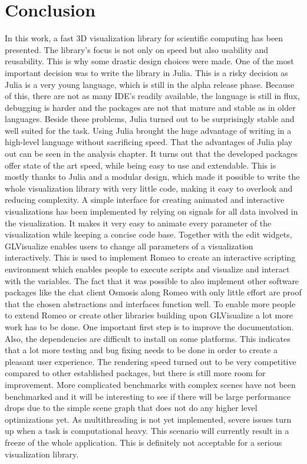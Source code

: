 \section{Conclusion}

In this work, a fast 3D visualization library for scientific computing has been presented. 
The library's focus is not only on speed but also usability and reusability. 
This is why some drastic design choices were made.
One of the most important decision was to write the library in Julia. 
This is a risky decision as Julia is a very young language, which is still in the alpha release phase. 
Because of this, there are not as many IDE's readily available, the language is still in flux, debugging is harder and the packages are not that mature and stable as in older languages.
Beside these problems, Julia turned out to be surprisingly stable and well suited for the task.
Using Julia brought the huge advantage of writing in a high-level language without sacrificing speed. 
That the advantages of Julia play out can be seen in the analysis chapter. It turns out that the developed packages offer state of the art speed, while being easy to use and extendable. 
This is mostly thanks to Julia and a modular design, which made it possible to write the whole visualization library with very little code, making it easy to overlook and reducing complexity. 
A simple interface for creating animated and interactive visualizations has been implemented by relying on signals for all data involved in the visualization.
It makes it very easy to animate every parameter of the visualization while keeping a concise code base.
Together with the edit widgets, GLVisualize enables users to change all parameters of a visualization interactively. 
This is used to implement Romeo to create an interactive scripting environment which enables people to execute scripts and visualize and interact with the variables.
The fact that it was possible to also implement other software packages like the chat client Osmosis along Romeo with only little effort are proof that the chosen abstractions and interfaces function well.
To enable more people to extend Romeo or create other libraries building upon GLVisualize a lot more work has to be done. 
One important first step is to improve the documentation. 
Also, the dependencies are difficult to install on some platforms. This indicates that a lot more testing and bug fixing needs to be done in order to create a pleasant user experience.
The rendering speed turned out to be very competitive compared to other established packages, but there is still more room for improvement.
More complicated benchmarks with complex scenes have not been benchmarked and it will be interesting to see if there will be large performance drops due to the simple scene graph that does not do any higher level optimizations yet.
As multithreading is not yet implemented, severe issues turn up when a task is computational heavy. This scenario will currently result in a freeze of the whole application. This is definitely not acceptable for a serious visualization library.
 
